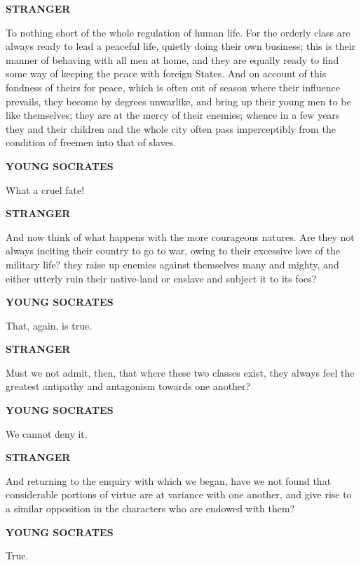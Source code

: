 \documentclass[11pt,letter]{article}
\begin{document}
\par \textbf{STRANGER}
\par   To nothing short of the whole regulation of human life. For the orderly class are always ready to lead a peaceful life, quietly doing their own business; this is their manner of behaving with all men at home, and they are equally ready to find some way of keeping the peace with foreign States. And on account of this fondness of theirs for peace, which is often out of season where their influence prevails, they become by degrees unwarlike, and bring up their young men to be like themselves; they are at the mercy of their enemies; whence in a few years they and their children and the whole city often pass imperceptibly from the condition of freemen into that of slaves.

\par \textbf{YOUNG SOCRATES}
\par   What a cruel fate!

\par \textbf{STRANGER}
\par   And now think of what happens with the more courageous natures. Are they not always inciting their country to go to war, owing to their excessive love of the military life? they raise up enemies against themselves many and mighty, and either utterly ruin their native-land or enslave and subject it to its foes?

\par \textbf{YOUNG SOCRATES}
\par   That, again, is true.

\par \textbf{STRANGER}
\par   Must we not admit, then, that where these two classes exist, they always feel the greatest antipathy and antagonism towards one another?

\par \textbf{YOUNG SOCRATES}
\par   We cannot deny it.

\par \textbf{STRANGER}
\par   And returning to the enquiry with which we began, have we not found that considerable portions of virtue are at variance with one another, and give rise to a similar opposition in the characters who are endowed with them?

\par \textbf{YOUNG SOCRATES}
\par   True.
\end{document}
